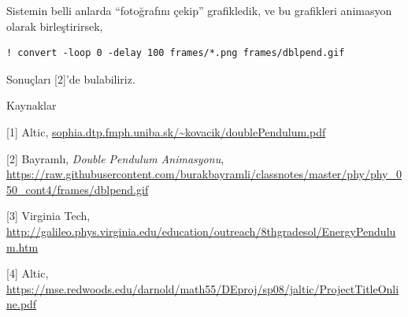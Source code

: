 \documentclass[12pt,fleqn]{article}\usepackage{../../common}
\begin{document}
Sistemin belli anlarda ``fotoğrafını çekip'' grafikledik, ve bu grafikleri
animasyon olarak birleştirirsek,

\begin{verbatim}
! convert -loop 0 -delay 100 frames/*.png frames/dblpend.gif
\end{verbatim}

Sonuçları [2]'de bulabiliriz. 

Kaynaklar

[1] Altic,
    \url{sophia.dtp.fmph.uniba.sk/~kovacik/doublePendulum.pdf}

[2] Bayramlı, {\em Double Pendulum Animasyonu},
    \url{https://raw.githubusercontent.com/burakbayramli/classnotes/master/phy/phy_050_cont4/frames/dblpend.gif}

[3] Virginia Tech,
    \url{http://galileo.phys.virginia.edu/education/outreach/8thgradesol/EnergyPendulum.htm}

[4] Altic,
    \url{https://mse.redwoods.edu/darnold/math55/DEproj/sp08/jaltic/ProjectTitleOnline.pdf}
\end{document}
